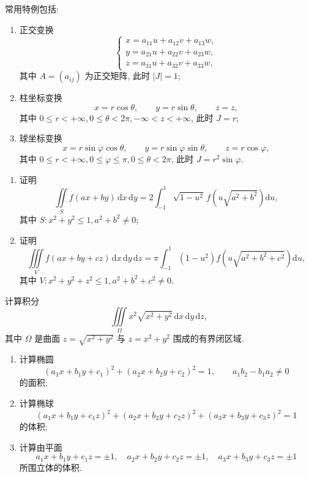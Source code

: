 \documentclass[../数学分析培优讲义.tex]{subfiles}
\begin{document}
\begin{remark}
常用特例包括:
\begin{enumerate}[label=(\arabic*)]
    \item 正交变换
    \[
        \begin{cases}
            x=a_{11}u+a_{12}v+a_{13}w,\\
            y=a_{21}u+a_{22}v+a_{23}w,\\
            z=a_{31}u+a_{32}v+a_{33}w,
        \end{cases}
    \]
    其中 $A=(a_{ij})$ 为正交矩阵, 此时 $|J|=1$;
    \item 柱坐标变换
    \[
        x=r\cos\theta,\qquad y=r\sin\theta,\qquad z=z,
    \]
    其中 $0\leq r<+\infty,0\leq\theta<2\pi,-\infty<z<+\infty$, 此时 $J=r$;
    \item 球坐标变换
    \[
        x=r\sin\varphi\cos\theta,\qquad
        y=r\sin\varphi\sin\theta,\qquad
        z=r\cos\varphi,
    \]
    其中 $0\leq r<+\infty,0\leq\varphi\leq\pi,0\leq\theta<2\pi$, 此时 $J=r^2\sin\varphi$.
\end{enumerate}
\end{remark}

\begin{example}
\begin{enumerate}[label=(\arabic*)]
    \item 证明
    \[
        \iint\limits_S f(ax+by)\,\mathrm{d}x\,\mathrm{d}y
        =2\int_{-1}^1\sqrt{1-u^2}\,f\left(u\sqrt{a^2+b^2}\right)\mathrm{d}u,
    \]
    其中 $S:x^2+y^2\leq1,a^2+b^2\ne0$;
    \item 证明
    \[
        \iiint\limits_Vf(ax+by+cz)\,\mathrm{d}x\,\mathrm{d}y\,\mathrm{d}z
        =\pi\int_{-1}^1(1-u^2)f\left(u\sqrt{a^2+b^2+c^2}\right)\mathrm{d}u,
    \]
    其中 $V:x^2+y^2+z^2\leq1,a^2+b^2+c^2\ne0$.
\end{enumerate}
\end{example}
\exampleblank

\begin{example}
计算积分
\[
    \iiint\limits_\Omega x^2\sqrt{x^2+y^2}\,\mathrm{d}x\,\mathrm{d}y\,\mathrm{d}z,
\]
其中 $\Omega$ 是曲面 $z=\sqrt{x^2+y^2}$ 与 $z=x^2+y^2$ 围成的有界闭区域.
\end{example}
\exampleblank

\begin{example}
\begin{enumerate}[label=(\arabic*)]
    \item 计算椭圆
    \[
        (a_1x+b_1y+c_1)^2+(a_2x+b_2y+c_2)^2=1,
        \qquad a_1b_2-b_1a_2\ne0
    \]
    的面积;
    \item 计算椭球
    \[
        (a_1x+b_1y+c_1z)^2+(a_2x+b_2y+c_2z)^2+(a_3x+b_3y+c_3z)^2=1
    \]
    的体积;
    \item 计算由平面
    \[
        a_1x+b_1y+c_1z=\pm1,\quad
        a_2x+b_2y+c_2z=\pm1,\quad
        a_3x+b_3y+c_3z=\pm1
    \]
    所围立体的体积.
\end{enumerate}
\end{example}
\exampleblank
\end{document}
